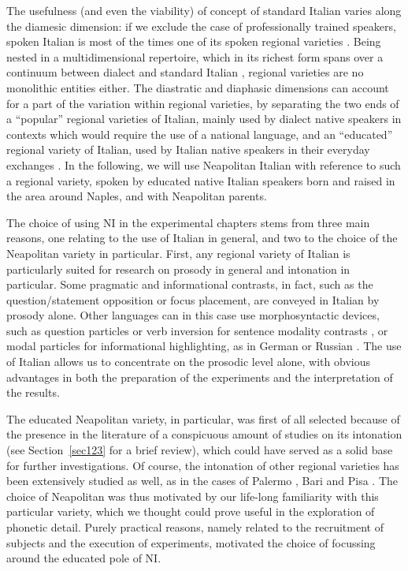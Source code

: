 The usefulness (and even the viability) of concept of standard Italian varies along the diamesic dimension: if we exclude the case of professionally trained speakers, spoken Italian is most of the times one of its spoken regional varieties \citep{bruni1992italiano}. Being nested in a multidimensional repertoire, which in its richest form spans over a continuum between dialect and standard Italian \citep{sabatini1985italiano}, regional varieties are no monolithic entities either. The diastratic and diaphasic dimensions can account for a part of the variation within regional varieties, by separating the two ends of a ``popular'' regional varieties of Italian, mainly used by dialect native speakers in contexts which would require the use of a national language, and an ``educated'' regional variety of Italian, used by Italian native speakers in their everyday exchanges \citep{sobrero1992italiano}. In the following, we will use Neapolitan Italian with reference to such a regional variety, spoken by educated native Italian speakers born and raised in the area around Naples, and with Neapolitan parents.

The choice of using NI in the experimental chapters stems from three main reasons, one relating to the use of Italian in general, and two to the choice of the Neapolitan variety in particular. First, any regional variety of Italian is particularly suited for research on prosody in general and intonation in particular. Some pragmatic and informational contrasts, in fact, such as the question/statement opposition or focus placement, are conveyed in Italian by prosody alone. Other languages can in this case use morphosyntactic devices, such as question particles or verb inversion for sentence modality contrasts \citep{wals-2011-116}, or modal particles for informational highlighting, as in German or Russian \citep{arndt1960modal}. The use of Italian allows us to concentrate on the prosodic level alone, with obvious advantages in both the preparation of the experiments and the interpretation of the results.

The educated Neapolitan variety, in particular, was first of all selected because of the presence in the literature of a conspicuous amount of studies on its intonation (see Section~\ref{sec123} for a brief review), which could have served as a solid base for further investigations. Of course, the intonation of other regional varieties has been extensively studied as well, as in the cases of Palermo \citep{grice1995intonation}, Bari \citep{savino1997ruolo} and Pisa \citep{gilifivela2004phonetics}. The choice of Neapolitan was thus motivated by our life-long familiarity with this particular variety, which we thought could prove useful in the exploration of phonetic detail. Purely practical reasons, namely related to the recruitment of subjects and the execution of experiments, motivated the choice of focussing around the educated pole of NI.

